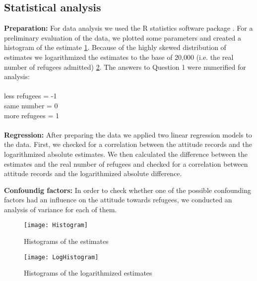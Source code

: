 \subsection{Statistical analysis}

\textbf{Preparation:} For data analysis we used the R statistics software package \citep{RCoreTeam2014}. For a preliminary evaluation of the data, we plotted some parameters and created a histogram of the estimate \ref{fig: Histogram1}. Because of the highly skewed distribution of estimates we logarithmized the estimates to the base of 20,000 (i.e. the real number of refugees admitted) \ref{fig: Histogram2}.
The answers to Question 1 were numerified for analysis: \\
\\
\indent\indent less refugees = -1\\
\indent\indent same number = 0\\
\indent\indent more refugees = 1\\
\\
\textbf{Regression:} After preparing the data we applied two linear regression models to the data. First, we checked for a correlation between the attitude records and the logarithmized absolute estimates. We then calculated the difference between the estimates and the real number of refugees and checked for a correlation between attitude records and the logarithmized absolute difference.


\noindent\textbf{Confoundig factors:} In order to check whether one of the possible confounding factors had an influence on the attitude towards refugees, we conducted an analysis of variance for each of them.



\begin{figure}[H]
	\centering 
	\texttt{[image: Histogram]}
	\caption{Histograms of the estimates}\label{fig: Histogram1}
\end{figure}

\begin{figure}[H]
	\centering 
	\texttt{[image: LogHistogram]}
	\caption{Histograms of the logarithmized estimates}\label{fig: Histogram2}
\end{figure}

